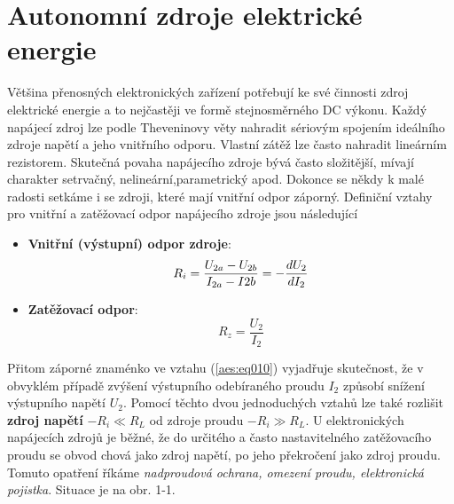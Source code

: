 \setchaptertoc
\chapter{Autonomní zdroje elektrické energie}

  Většina přenosných elektronických zařízení potřebují ke své činnosti zdroj elektrické energie a 
  to nejčastěji ve formě stejnosměrného DC výkonu. Každý napájecí zdroj lze podle Theveninovy věty 
  nahradit sériovým spojením ideálního zdroje napětí a jeho vnitřního odporu. Vlastní zátěž lze 
  často nahradit lineárním rezistorem. Skutečná povaha napájecího zdroje bývá často složitější, 
  mívají charakter setrvačný, nelineární,pa\-ra\-me\-tri\-cký apod. Dokonce se někdy k malé radosti 
  setkáme 
  i se zdroji, které mají vnitřní odpor záporný. Definiční vztahy pro vnitřní a zatěžovací odpor 
  napájecího zdroje jsou následující
  \begin{itemize}
    \item \textbf{Vnitřní (výstupní) odpor zdroje}:
          \begin{equation}\label{aes:eq010}
            R_i = \frac{U_{2a}-U_{2b}}{I_{2a} - I{2b}} = -\dfrac{d U_2}{d I_2}
          \end{equation}
    \item \textbf{Zatěžovací odpor}:
          \begin{equation}\label{aes:eq011}
            R_z = \frac{U_2}{I_2}
          \end{equation}
  \end{itemize}
  Přitom záporné znaménko ve vztahu (\ref{aes:eq010}) vyjadřuje skutečnost, že v obvyklém případě 
  zvýšení výstupního odebíraného proudu \(I_2\) způsobí snížení výstupního napětí \(U_2\). Pomocí 
  těchto dvou jednoduchých vztahů lze také rozlišit \textbf{zdroj napětí} \(- R_i \ll R_L\) od 
  zdroje proudu \(- R_i\gg R_L\). U elektronických napájecích zdrojů je běžné, že do určitého a 
  často nastavitelného zatěžovacího proudu se obvod chová jako zdroj napětí, po jeho překročení 
  jako zdroj proudu. Tomuto opatření říkáme \emph{nadproudová ochrana, omezení proudu, elektronická 
  pojistka}. Situace je na obr. 1-1.
  
